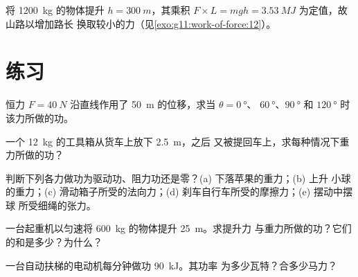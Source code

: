 \begin{omfigure}

{\small 将 \qty{1200}{kg} 的物体提升 $h = \qty{300}{m}$，其乘积
$F \times L = mgh = \qty{3.53}{MJ}$ 为定值，故山路以增加路长
换取较小的力（见\cref{exo:g11:work-of-force:12}）。}
\end{omfigure}

\section{练习}

\begin{exercise}[$\star$]\label{exo:g11:work-of-force:1}
恒力 $F = \qty{40}{N}$ 沿直线作用了 \qty{50}{m}
的位移，求当 $\theta = \qty{0}{\degree}$、
$\qty{60}{\degree}$、$\qty{90}{\degree}$ 和 $\qty{120}{\degree}$ 时该力所做的功。
\end{exercise}

\begin{exercise}[$\star$]\label{exo:g11:work-of-force:2}
一个 \qty{12}{kg} 的工具箱从货车上放下 \qty{2.5}{m}，之后
又被提回车上，求每种情况下重力所做的功？
\end{exercise}

\begin{exercise}[$\star$]\label{exo:g11:work-of-force:3}
判断下列各力做功为驱动功、阻力功还是零？(a) 下落苹果的重力；(b) 上升
小球的重力；(c) 滑动箱子所受的法向力；(d)
刹车自行车所受的摩擦力；(e) 摆动中摆球
所受细绳的张力。
\end{exercise}

\begin{exercise}[$\star$]\label{exo:g11:work-of-force:4}
一台起重机以匀速将 \qty{600}{kg} 的物体提升 \qty{25}{m}。求提升力
与重力所做的功？它们的和是多少？为什么？
\end{exercise}

\begin{exercise}[$\star$]\label{exo:g11:work-of-force:5}
一台自动扶梯的电动机每分钟做功 \qty{90}{kJ}。其功率
为多少瓦特？合多少马力？
\end{exercise}

